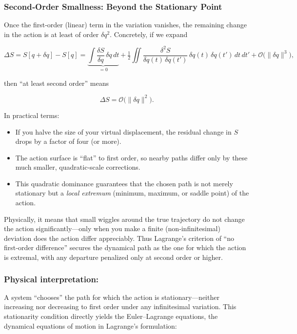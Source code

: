 \subsubsection{Second‐Order Smallness: Beyond the Stationary Point}

Once the first‐order (linear) term in the variation vanishes, the remaining change in the action is at least of order \(\delta q^2\).  Concretely, if we expand

\[
\Delta S = S[q + \delta q] - S[q]
= \underbrace{\int \frac{\delta S}{\delta q}\,\delta q\,dt}_{=0}
+ \tfrac12 \iint \frac{\delta^2 S}{\delta q(t)\,\delta q(t')}\,\delta q(t)\,\delta q(t')\,dt\,dt'
+ \mathcal{O}\bigl(\|\delta q\|^3\bigr),
\]

then “at least second order” means

\[
\Delta S = \mathcal{O}\bigl(\|\delta q\|^2\bigr).
\]

In practical terms:
\begin{itemize}
  \item If you halve the size of your virtual displacement, the residual change in \(S\) drops by a factor of four (or more).
  \item The action surface is “flat” to first order, so nearby paths differ only by these much smaller, quadratic‐scale corrections.
  \item This quadratic dominance guarantees that the chosen path is not merely stationary but a \emph{local extremum} (minimum, maximum, or saddle point) of the action.
\end{itemize}

Physically, it means that small wiggles around the true trajectory do not change the action significantly—only when you make a finite (non‐infinitesimal) deviation does the action differ appreciably.  Thus Lagrange’s criterion of “no first‐order difference” secures the dynamical path as the one for which the action is extremal, with any departure penalized only at second order or higher.  


\subsubsection{Physical interpretation:}  
A system “chooses” the path for which the action is stationary—neither increasing nor decreasing to first order under any infinitesimal variation.  This stationarity condition directly yields the Euler–Lagrange equations, the dynamical equations of motion in Lagrange’s formulation:

